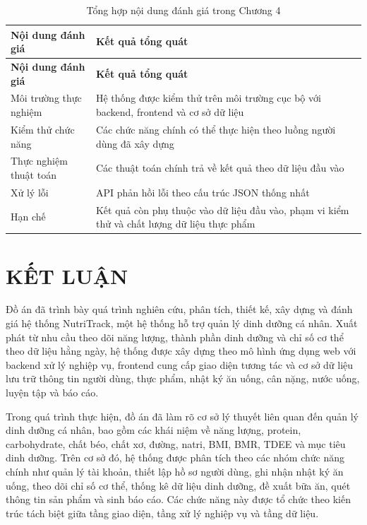 \documentclass[12pt, a4paper]{report}
\begin{document}
\begin{longtable}{|>{\raggedright\arraybackslash}p{5cm}|p{10cm}|}
\caption{Tổng hợp nội dung đánh giá trong Chương 4}
\label{tab:tong_hop_chuong_4} \\
\hline
\textbf{Nội dung đánh giá} & \textbf{Kết quả tổng quát} \\
\hline
\endfirsthead
\hline
\textbf{Nội dung đánh giá} & \textbf{Kết quả tổng quát} \\
\hline
\endhead

Môi trường thực nghiệm & Hệ thống được kiểm thử trên môi trường cục bộ với backend, frontend và cơ sở dữ liệu \\
\hline
Kiểm thử chức năng & Các chức năng chính có thể thực hiện theo luồng người dùng đã xây dựng \\
\hline
Thực nghiệm thuật toán & Các thuật toán chính trả về kết quả theo dữ liệu đầu vào \\
\hline
Xử lý lỗi & API phản hồi lỗi theo cấu trúc JSON thống nhất \\
\hline
Hạn chế & Kết quả còn phụ thuộc vào dữ liệu đầu vào, phạm vi kiểm thử và chất lượng dữ liệu thực phẩm \\
\hline
\end{longtable}

\chapter*{KẾT LUẬN}
Đồ án đã trình bày quá trình nghiên cứu, phân tích, thiết kế, xây dựng và đánh giá hệ thống NutriTrack, một hệ thống hỗ trợ quản lý dinh dưỡng cá nhân. Xuất phát từ nhu cầu theo dõi năng lượng, thành phần dinh dưỡng và chỉ số cơ thể theo dữ liệu hằng ngày, hệ thống được xây dựng theo mô hình ứng dụng web với backend xử lý nghiệp vụ, frontend cung cấp giao diện tương tác và cơ sở dữ liệu lưu trữ thông tin người dùng, thực phẩm, nhật ký ăn uống, cân nặng, nước uống, luyện tập và báo cáo.

Trong quá trình thực hiện, đồ án đã làm rõ cơ sở lý thuyết liên quan đến quản lý dinh dưỡng cá nhân, bao gồm các khái niệm về năng lượng, protein, carbohydrate, chất béo, chất xơ, đường, natri, BMI, BMR, TDEE và mục tiêu dinh dưỡng. Trên cơ sở đó, hệ thống được phân tích theo các nhóm chức năng chính như quản lý tài khoản, thiết lập hồ sơ người dùng, ghi nhận nhật ký ăn uống, theo dõi chỉ số cơ thể, thống kê dữ liệu dinh dưỡng, đề xuất bữa ăn, quét thông tin sản phẩm và sinh báo cáo. Các chức năng này được tổ chức theo kiến trúc tách biệt giữa tầng giao diện, tầng xử lý nghiệp vụ và tầng dữ liệu.
\end{document}
